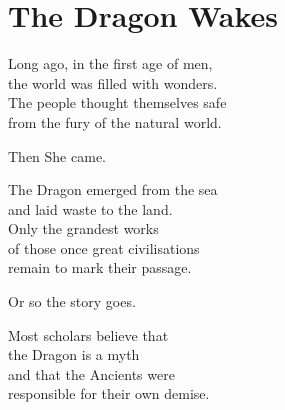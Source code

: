 \documentclass[12pt, a5paper, parskip=half-, footheight=1.4cm]{scrartcl}
\begin{document}


%		
%
%
%
%
%
%		


\setmainfont{URWClassico}
\normalsize


\center

\setcounter{page}{1}
\section*{\huge \phantom{a} \hfill The Dragon Wakes \hfill \phantom{a}} \label{section:the-dragon-wakes}
\bigskip
Long ago, in the first age of men,\\
the world was filled with wonders. \\
The people thought themselves safe \\
from the fury of the natural world.

\medskip

Then She came.

\medskip

The Dragon emerged from the sea\\and laid waste to the land.\\
Only the grandest works\\of those once great civilisations\\remain to mark their passage.

\medskip

Or so the story goes.

\medskip

Most scholars believe that\\the Dragon is a myth\\and that the Ancients were\\responsible for their own demise.
\end{document}
